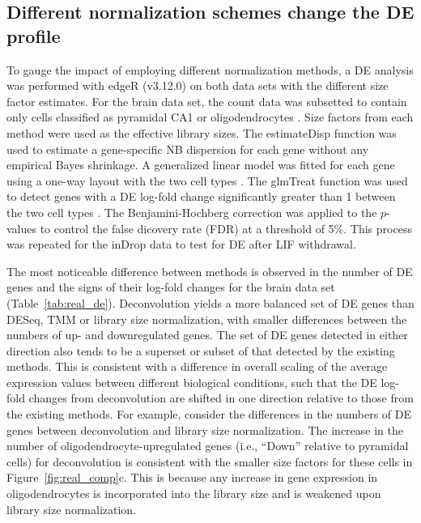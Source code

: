 \documentclass{bmcart}
\begin{document}
\subsection*{Different normalization schemes change the DE profile}
To gauge the impact of employing different normalization methods, a DE analysis was performed with edgeR (v3.12.0) on both data sets with the different size factor estimates.
For the brain data set, the count data was subsetted to contain only cells classified as pyramidal CA1 or oligodendrocytes \cite{zeisel2015brain}.
Size factors from each method were used as the effective library sizes.
The estimateDisp function was used to estimate a gene-specific NB dispersion for each gene \cite{chen2014differential} without any empirical Bayes shrinkage.
A generalized linear model was fitted for each gene using a one-way layout with the two cell types \cite{mccarthy2012differential}.
The glmTreat function was used to detect genes with a DE log-fold change significantly greater than 1 between the two cell types \cite{mccarthy2009testing}.
The Benjamini-Hochberg correction was applied to the $p$-values to control the false dicovery rate (FDR) at a threshold of 5\%.
This process was repeated for the inDrop data to test for DE after LIF withdrawal.


The most noticeable difference between methods is observed in the number of DE genes and the signs of their log-fold changes for the brain data set (Table~\ref{tab:real_de}).
Deconvolution yields a more balanced set of DE genes than DESeq, TMM or library size normalization, with smaller differences between the numbers of up- and downregulated genes.
The set of DE genes detected in either direction also tends to be a superset or subset of that detected by the existing methods.
This is consistent with a difference in overall scaling of the average expression values between different biological conditions, 
    such that the DE log-fold changes from deconvolution are shifted in one direction relative to those from the existing methods.
For example, consider the differences in the numbers of DE genes between deconvolution and library size normalization.
The increase in the number of oligodendrocyte-upregulated genes (i.e., ``Down'' relative to pyramidal cells) for deconvolution is consistent with the smaller size factors for these cells in Figure~\ref{fig:real_comp}c.
This is because any increase in gene expression in oligodendrocytes is incorporated into the library size and is weakened upon library size normalization.
\end{document}
